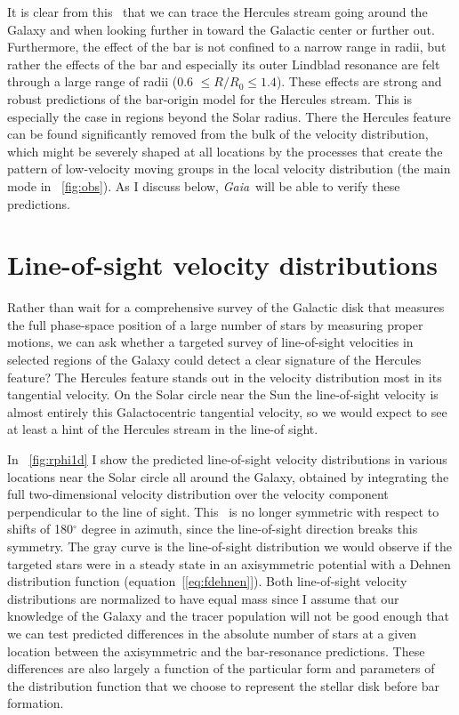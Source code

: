 \documentclass[12pt,preprint]{aastex}
\newcommand{\eqnname}{equation}
\newcommand{\Gaia}{\emph{Gaia}}
\newcommand{\Ro}{\ensuremath{R_0}}
\begin{document}
It is clear from this \figurename\ that we can trace the Hercules
stream going around the Galaxy and when looking further in toward the
Galactic center or further out. Furthermore, the effect of the bar is
not confined to a narrow range in radii, but rather the effects of the
bar and especially its outer Lindblad resonance are felt through a
large range of radii (0.6 $\leq R/\Ro \leq 1.4$). These effects are
strong and robust predictions of the bar-origin model for the Hercules
stream. This is especially the case in regions beyond the Solar
radius. There the Hercules feature can be found significantly removed
from the bulk of the velocity distribution, which might be severely
shaped at all locations by the processes that create the pattern of
low-velocity moving groups in the local velocity distribution (the
main mode in \figurename~\ref{fig:obs}). As I discuss below, \Gaia\
will be able to verify these predictions.




\section{Line-of-sight velocity distributions}

Rather than wait for a comprehensive survey of the Galactic disk that
measures the full phase-space position of a large number of stars by
measuring proper motions, we can ask whether a targeted survey of
line-of-sight velocities in selected regions of the Galaxy could
detect a clear signature of the Hercules feature? The Hercules feature
stands out in the velocity distribution most in its tangential
velocity. On the Solar circle near the Sun the line-of-sight velocity
is almost entirely this Galactocentric tangential velocity, so we
would expect to see at least a hint of the Hercules stream in the
line-of sight.

In \figurename~\ref{fig:rphi1d} I show the predicted line-of-sight
velocity distributions in various locations near the Solar circle all
around the Galaxy, obtained by integrating the full two-dimensional
velocity distribution over the velocity component perpendicular to the
line of sight. This \figurename\ is no longer symmetric with respect
to shifts of 180$^{\circ}$ degree in azimuth, since the line-of-sight
direction breaks this symmetry. The gray curve is the line-of-sight
distribution we would observe if the targeted stars were in a steady
state in an axisymmetric potential with a Dehnen distribution function
(\eqnname~[\ref{eq:fdehnen}]). Both line-of-sight velocity
distributions are normalized to have equal mass since I assume that
our knowledge of the Galaxy and the tracer population will not be good
enough that we can test predicted differences in the absolute number
of stars at a given location between the axisymmetric and the
bar-resonance predictions. These differences are also largely a
function of the particular form and parameters of the distribution
function that we choose to represent the stellar disk before bar
formation.
\end{document}
